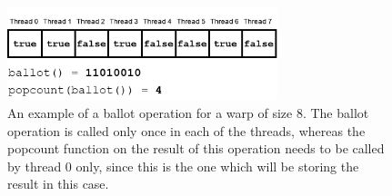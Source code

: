 \begin{figure}[t]
  \centering
  \includegraphics[width=0.7\textwidth]{images/Ballot.png}
  \caption{An example of a ballot operation for a warp of size 8. The ballot operation is called only once in each of the threads, whereas the popcount function on the result of this operation needs to be called by thread 0 only, since this is the one which will be storing the result in this case.}\label{fig:Ballot}
\end{figure}

